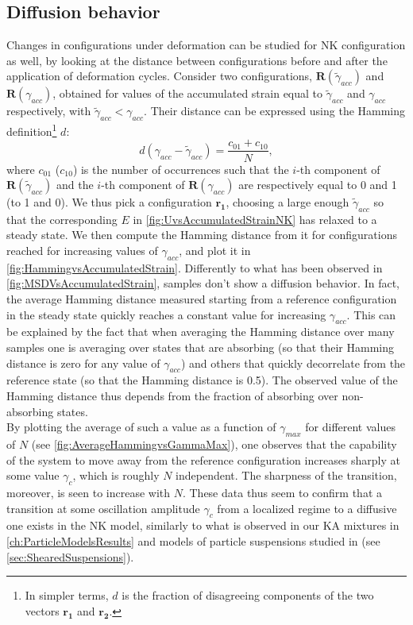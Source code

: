 \subsection{Diffusion behavior}

Changes in configurations under deformation can be studied for NK configuration as well, by looking at the distance between configurations before and after the application of deformation cycles.
Consider two configurations, $\mathbf{R}(\widetilde{\gamma}_{acc})$ and $\mathbf{R}(\gamma_{acc})$, obtained for values of the accumulated strain equal to $\widetilde{\gamma}_{acc}$ and $\gamma_{acc}$ respectively, with $\widetilde{\gamma}_{acc} < \gamma_{acc}$. Their distance can be expressed using the Hamming definition\footnote{In simpler terms, $d$ is the fraction of disagreeing components of the two vectors $\mathbf{r_{1}}$ and $\mathbf{r_{2}}$.} $d$:
\begin{equation}
	d(\gamma_{acc} - \widetilde{\gamma}_{acc}) = \frac{c_{01} + c_{10}}{N},
	\label{eq:HammingDistance}
\end{equation}
where $c_{01}$ ($c_{10}$) is the number of occurrences such that the $i$-th component of $\mathbf{R}(\widetilde{\gamma}_{acc})$ and the $i$-th component of $\mathbf{R}(\gamma_{acc})$ are respectively equal to 0 and 1 (to 1 and 0). 
We thus pick a configuration $\mathbf{r_{1}}$, choosing a large enough $\widetilde{\gamma}_{acc}$ so that the corresponding $E$ in \autoref{fig:UvsAccumulatedStrainNK} has relaxed to a steady state. We then compute the Hamming distance from it for configurations reached for increasing values of $\gamma_{acc}$, and plot it in \autoref{fig:HammingvsAccumulatedStrain}. Differently to what has been observed in \autoref{fig:MSDVsAccumulatedStrain}, samples don't show a diffusion behavior. In fact, the average Hamming distance measured starting from a reference configuration in the steady state quickly reaches a constant value for increasing $\gamma_{acc}$. This can be explained by the fact that when averaging the Hamming distance over many samples one is averaging over states that are absorbing (so that their Hamming distance is zero for any value of $\gamma_{acc}$) and others that quickly decorrelate from the reference state (so that the Hamming distance is 0.5). The observed value of the Hamming distance thus depends from the fraction of absorbing over non-absorbing states.\\
By plotting the average of such a value as a function of $\gamma_{max}$ for different values of $N$ (see \autoref{fig:AverageHammingvsGammaMax}), one observes that the capability of the system to move away from the reference configuration increases sharply at some value $\gamma_{c}$, which is roughly $N$ independent. The sharpness of the transition, moreover, is seen to increase with $N$. These data thus seem to confirm that a transition at some oscillation amplitude $\gamma_{c}$  from a localized regime to a diffusive one exists in the NK model, similarly to what is observed in our KA mixtures in \autoref{ch:ParticleModelsResults} and models of particle suspensions studied in \cite{keim2011generic} (see \autoref{sec:ShearedSuspensions}).

